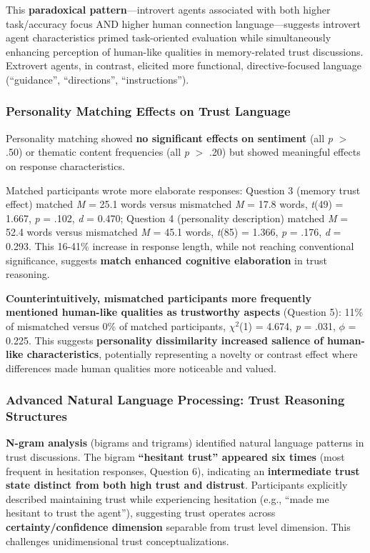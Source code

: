 \documentclass[12pt]{article}
\begin{document}
This \textbf{paradoxical pattern}---introvert agents associated with both higher task/accuracy focus AND higher human connection language---suggests introvert agent characteristics primed task-oriented evaluation while simultaneously enhancing perception of human-like qualities in memory-related trust discussions. Extrovert agents, in contrast, elicited more functional, directive-focused language (``guidance'', ``directions'', ``instructions'').

\subsubsection{Personality Matching Effects on Trust Language}

Personality matching showed \textbf{no significant effects on sentiment} (all \textit{p} $>$ .50) or thematic content frequencies (all \textit{p} $>$ .20) but showed meaningful effects on response characteristics.

Matched participants wrote more elaborate responses: Question 3 (memory trust effect) matched \textit{M} = 25.1 words versus mismatched \textit{M} = 17.8 words, \textit{t}(49) = 1.667, \textit{p} = .102, \textit{d} = 0.470; Question 4 (personality description) matched \textit{M} = 52.4 words versus mismatched \textit{M} = 45.1 words, \textit{t}(85) = 1.366, \textit{p} = .176, \textit{d} = 0.293. This 16-41\% increase in response length, while not reaching conventional significance, suggests \textbf{match enhanced cognitive elaboration} in trust reasoning.

\textbf{Counterintuitively, mismatched participants more frequently mentioned human-like qualities as trustworthy aspects} (Question 5): 11\% of mismatched versus 0\% of matched participants, $\chi^2$(1) = 4.674, \textit{p} = .031, $\phi$ = 0.225. This suggests \textbf{personality dissimilarity increased salience of human-like characteristics}, potentially representing a novelty or contrast effect where differences made human qualities more noticeable and valued.

\subsubsection{Advanced Natural Language Processing: Trust Reasoning Structures}

\textbf{N-gram analysis} (bigrams and trigrams) identified natural language patterns in trust discussions. The bigram \textbf{``hesitant trust'' appeared six times} (most frequent in hesitation responses, Question 6), indicating an \textbf{intermediate trust state distinct from both high trust and distrust}. Participants explicitly described maintaining trust while experiencing hesitation (e.g., ``made me hesitant to trust the agent''), suggesting trust operates across \textbf{certainty/confidence dimension} separable from trust level dimension. This challenges unidimensional trust conceptualizations.
\end{document}

